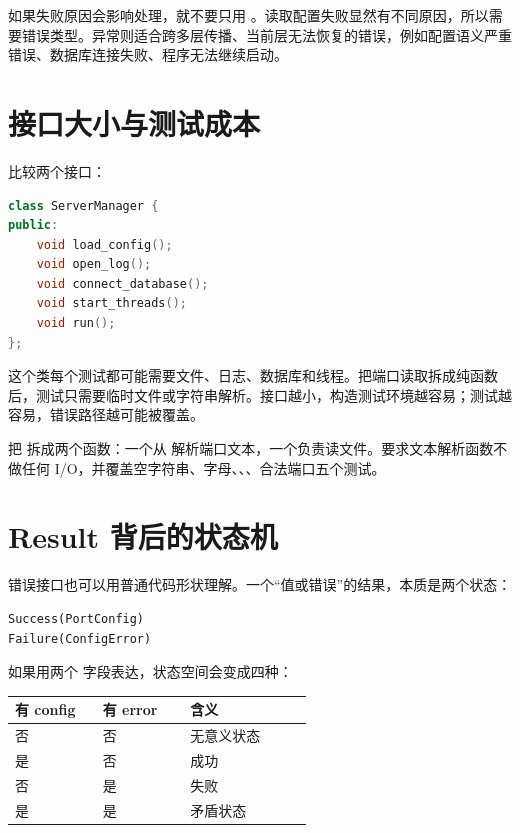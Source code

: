如果失败原因会影响处理，就不要只用 。读取配置失败显然有不同原因，所以需要错误类型。异常则适合跨多层传播、当前层无法恢复的错误，例如配置语义严重错误、数据库连接失败、程序无法继续启动。

\section{接口大小与测试成本}

比较两个接口：

\begin{lstlisting}[language=C++,caption={过大的接口难测试}]
class ServerManager {
public:
    void load_config();
    void open_log();
    void connect_database();
    void start_threads();
    void run();
};
\end{lstlisting}

这个类每个测试都可能需要文件、日志、数据库和线程。把端口读取拆成纯函数后，测试只需要临时文件或字符串解析。接口越小，构造测试环境越容易；测试越容易，错误路径越可能被覆盖。

\begin{exercisebox}
把  拆成两个函数：一个从  解析端口文本，一个负责读文件。要求文本解析函数不做任何 I/O，并覆盖空字符串、字母、、、合法端口五个测试。
\end{exercisebox}

\section{Result 背后的状态机}

错误接口也可以用普通代码形状理解。一个“值或错误”的结果，本质是两个状态：

\begin{lstlisting}[caption={Result 状态}]
Success(PortConfig)
Failure(ConfigError)
\end{lstlisting}

如果用两个  字段表达，状态空间会变成四种：

\begin{longtable}{p{0.25\linewidth}p{0.25\linewidth}p{0.35\linewidth}}
\toprule
有 config & 有 error & 含义 \\
\midrule
否 & 否 & 无意义状态 \\
是 & 否 & 成功 \\
否 & 是 & 失败 \\
是 & 是 & 矛盾状态 \\
\bottomrule
\end{longtable}


